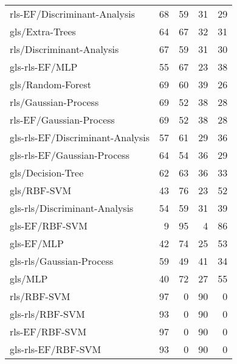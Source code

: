 \begin{longtable}{lrrrr}
    rls-EF/Discriminant-Analysis     &  68 &  59 &  31 &  29 \\
    gls/Extra-Trees                  &  64 &  67 &  32 &  31 \\
    rls/Discriminant-Analysis        &  67 &  59 &  31 &  30 \\
    gls-rls-EF/MLP                   &  55 &  67 &  23 &  38 \\
    gls/Random-Forest                &  69 &  60 &  39 &  26 \\
    rls/Gaussian-Process             &  69 &  52 &  38 &  28 \\
    rls-EF/Gaussian-Process          &  69 &  52 &  38 &  28 \\
    gls-rls-EF/Discriminant-Analysis &  57 &  61 &  29 &  36 \\
    gls-rls-EF/Gaussian-Process      &  64 &  54 &  36 &  29 \\
    gls/Decision-Tree                &  62 &  63 &  36 &  33 \\
    gls/RBF-SVM                      &  43 &  76 &  23 &  52 \\
    gls-rls/Discriminant-Analysis    &  54 &  59 &  31 &  39 \\
    gls-EF/RBF-SVM                   &   9 &  95 &   4 &  86 \\
    gls-EF/MLP                       &  42 &  74 &  25 &  53 \\
    gls-rls/Gaussian-Process         &  59 &  49 &  41 &  34 \\
    gls/MLP                          &  40 &  72 &  27 &  55 \\
    rls/RBF-SVM                      &  97 &   0 &  90 &   0 \\
    gls-rls/RBF-SVM                  &  93 &   0 &  90 &   0 \\
    rls-EF/RBF-SVM                   &  97 &   0 &  90 &   0 \\
    gls-rls-EF/RBF-SVM               &  93 &   0 &  90 &   0 \\
    \hline
\end{longtable}

